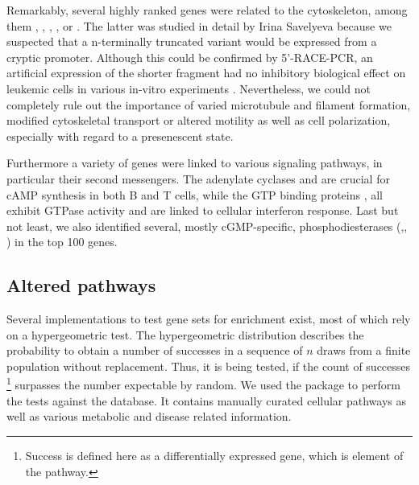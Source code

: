 Remarkably, several highly ranked genes were related to the cytoskeleton, among them , , , ,  or . The latter was studied in detail by Irina Savelyeva because we suspected that a n-terminally truncated variant would be expressed from a cryptic promoter. Although this could be confirmed by 5'-RACE-PCR, an artificial expression of the shorter fragment had no inhibitory biological effect on \dnmtwt \mllafnine leukemic cells in various in-vitro experiments \dns. Nevertheless, we could not completely rule out the importance of varied microtubule and filament formation, modified cytoskeletal transport or altered motility as well as cell polarization, especially with regard to a presenescent state. 

Furthermore a variety of genes were linked to various signaling pathways, in particular their second messengers. The adenylate cyclases  and  are crucial for cAMP synthesis in both B and T cells\cite{Duan2010}, while the GTP binding proteins ,  all exhibit GTPase activity and are linked to cellular interferon response\cite{Collazo2001,Bafica2007}. Last but not least, we also identified several, mostly cGMP-specific, phosphodiesterases (,, ) in the top 100 genes. 

\subsection{Altered pathways}
\label{chap:r:degenes:genotypecontrast:pathways}

Several implementations to test gene sets for enrichment exist, most of which rely on a hypergeometric test\cite{Huang2009}. The hypergeometric distribution describes the probability to obtain a number of successes in a sequence of $n$ draws from a finite population without replacement. Thus, it is being tested, if the count of successes \footnote{Success is defined here as a differentially expressed gene, which is element of the pathway.} surpasses the number expectable by random. We used the \cite{Zhao2015} package to perform the tests against the  database. It contains manually curated cellular pathways as well as various metabolic and disease related information. 


